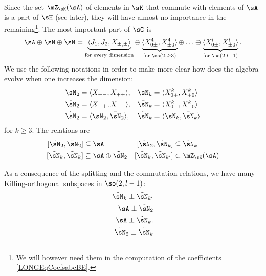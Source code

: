 Since the set $\mZ_{\sK}(\sA)$ of elements in $\sK$ that commute with elements of $\sA$ is a part of $\sH$ (see later), they will have almost no importance in the remaining\footnote{We will however need them in the computation of the coefficients \eqref{LONGEqCoefsabcBE}.}. The most important part of $\sG$ is
\begin{equation}		\label{LONGEqDecomDimQlipm}
    \sA\oplus\sN\oplus\bar\sN=\underbrace{\langle J_1,J_2,X_{\pm,\pm}\rangle}_{\text{for every dimension}}\oplus\underbrace{\langle X_{0\pm}^{4},X_{\pm 0}^{4}\rangle}_{\text{for }\so(2,\geq 3)}\oplus\ldots\oplus\underbrace{\langle X_{0\pm}^l,X_{\pm 0}^{l}\rangle}_{\text{for } \so(2, l-1)}.
\end{equation}
We use the following notations in order to make more clear how does the algebra evolve when one increases the dimension:
\begin{equation}
	\begin{aligned}[]
		\sN_2&=\langle X_{+-},X_{++}\rangle,		&\sN_k&=\langle X^k_{0+},X_{+0}^k\rangle	\\
		\bar\sN_2&=\langle X_{-+},X_{--} \rangle, 	&\bar\sN_k&=\langle X_{0-}^k,X_{-0}^k\rangle\\
		\tilde\sN_2&=\langle \sN_2,\bar\sN_2\rangle,	&\tilde\sN_k&=\langle \sN_k,\bar\sN_k\rangle
	\end{aligned}
\end{equation}
for $k\geq 3$. The relations are
\begin{equation}		\label{LONGEqsCommWithtsNDeuxkA}
	\begin{aligned}[]
		[\tilde\sN_2,\tilde\sN_2]&\subseteq\sA
		&[\tilde\sN_2,\tilde\sN_k]&\subseteq\tilde\sN_k\\
		[\tilde\sN_k,\tilde\sN_{k}]&\subseteq\sA\oplus\tilde\sN_2
		&[\tilde\sN_k,\tilde\sN_{k'}]&\subset \mZ_{\sK}(\sA) \\
	\end{aligned}
\end{equation}

As a consequence of the splitting and the commutation relations, we have many Killing-orthogonal subspaces in $\so(2,l-1)$:
\begin{subequations}
	\begin{align}
		\tilde\sN_k\perp\tilde\sN_{k'}		\label{LONGEqtsnkperprtsnkp}	\\
		\sA\perp\tilde\sN_2			\label{LONGEqAperpNTrois}		\\
		\sA\perp\tilde\sN_k.	\label{LONGEqAperpNk}				\\
		\tilde\sN_2\perp\tilde\sN_k	\label{LONGEqNTtroisperpNk}
	\end{align}
\end{subequations}

